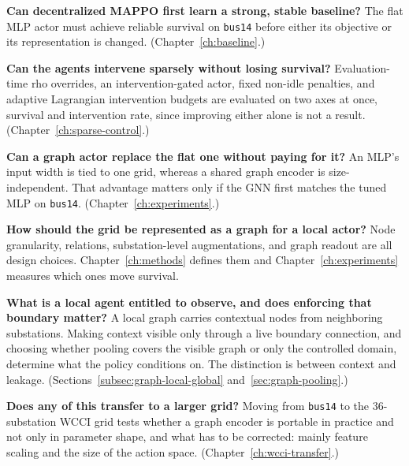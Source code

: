 \begin{enumerate}
  \item \textbf{Can decentralized MAPPO first learn a strong, stable
  baseline?} The flat MLP actor must achieve reliable survival on
  \texttt{bus14} before either its objective or its representation is changed.
  (Chapter~\ref{ch:baseline}.)

  {\color{blue}
  \item \textbf{Can the agents intervene sparsely without losing survival?}
  Evaluation-time rho overrides, an intervention-gated actor, fixed non-idle
  penalties, and adaptive Lagrangian intervention budgets are evaluated on two
  axes at once, survival and intervention rate, since improving either alone is
  not a result. (Chapter~\ref{ch:sparse-control}.)
  }

  \item \textbf{Can a graph actor replace the flat one without paying for it?}
  An MLP's input width is tied to one grid, whereas a shared graph encoder is
  size-independent. That advantage matters only if the GNN first matches the
  tuned MLP on \texttt{bus14}. (Chapter~\ref{ch:experiments}.)

  \item \textbf{How should the grid be represented as a graph for a local
  actor?} Node granularity, relations, substation-level augmentations, and graph
  readout are all design choices. Chapter~\ref{ch:methods} defines them and
  Chapter~\ref{ch:experiments} measures which ones move survival.

  \item \textbf{What is a local agent entitled to observe, and does enforcing
  that boundary matter?} A local graph carries contextual nodes from
  neighboring substations. Making context visible only through a live boundary
  connection, and choosing whether pooling covers the visible graph or only the
  controlled domain, determine what the policy conditions on. The distinction
  is between context and leakage. (Sections~\ref{subsec:graph-local-global}
  and~\ref{sec:graph-pooling}.)

  \item \textbf{Does any of this transfer to a larger grid?} Moving from
  \texttt{bus14} to the 36-substation WCCI grid tests whether a graph encoder is
  portable in practice and not only in parameter shape, and what has to be
  corrected: mainly feature scaling and the size of the action
  space.
  (Chapter~\ref{ch:wcci-transfer}.)
\end{enumerate}

